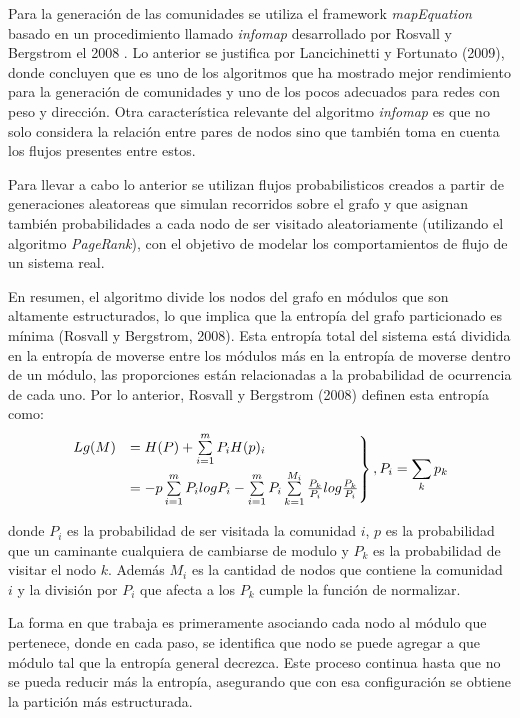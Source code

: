 \documentclass[12pt]{article}
\begin{document}
	Para la generación de las comunidades se utiliza el framework \textit{mapEquation} basado en un procedimiento llamado \textit{infomap} desarrollado por Rosvall y Bergstrom el 2008 \cite{Infomap}. Lo anterior se justifica por Lancichinetti y Fortunato (2009)\cite{Comparar_generador_comunidad}, donde concluyen que es uno de los algoritmos que ha mostrado mejor rendimiento para la generación de comunidades y uno de los pocos adecuados para redes con peso y dirección. Otra característica relevante del algoritmo \textit{infomap} es que no solo considera la relación entre pares de nodos sino que también toma en cuenta los flujos presentes entre estos. 
	
	Para llevar a cabo lo anterior se utilizan flujos probabilisticos creados a partir de generaciones aleatoreas que simulan recorridos sobre el grafo y que asignan también probabilidades a cada nodo de ser visitado aleatoriamente (utilizando el algoritmo \textit{PageRank}), con el objetivo de modelar los comportamientos de flujo de un sistema real.
	
	En resumen, el algoritmo divide los nodos del grafo en módulos que son altamente estructurados, lo que implica que la entropía del grafo particionado es mínima (Rosvall y Bergstrom, 2008)\cite{Infomap}. Esta entropía total del sistema está dividida en la entropía de moverse entre los módulos más en la entropía de moverse dentro de un módulo, las proporciones están relacionadas a la probabilidad de ocurrencia de cada uno. Por lo anterior, Rosvall y Bergstrom (2008) definen esta entropía como:
	$$
	\begin{rcases}
	Lg(M) &= H(P) + \sum\limits_{i=1}^m P_i H(p)_i \\
	      &= -p\sum\limits_{i=1}^m P_i log P_i -\sum\limits_{i=1}^m P_i\sum\limits_{k=1}^{M_i} \frac{P_k}{P_i}log\frac{P_k}{P_i}
	\end{rcases} , P_i = \sum_k p_k
	$$
	
donde $P_i$	es la probabilidad de ser visitada la comunidad $i$, $p$ es la probabilidad que un caminante cualquiera de cambiarse de modulo y $P_k$ es la probabilidad de visitar el nodo $k$. Además $M_i$ es la cantidad de nodos que contiene la comunidad $i$ y la división por $P_i$ que afecta a los $P_k$ cumple la función de normalizar.

La forma en que trabaja es primeramente asociando cada nodo al módulo que pertenece, donde en cada paso, se identifica que nodo se puede agregar a que módulo tal que la entropía general decrezca. Este proceso continua hasta que no se pueda reducir más la entropía, asegurando que con esa configuración se obtiene la partición más estructurada.
\end{document}
